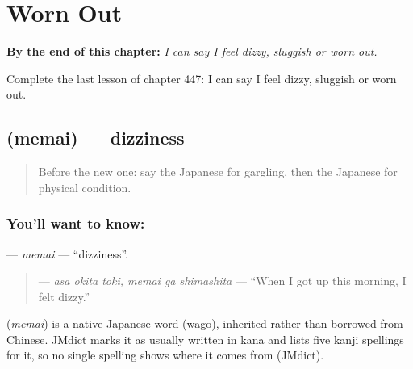 
\chapter{Worn Out}
\label{ch:ja-worn-out}

\begin{chapteropening}
\textbf{By the end of this chapter:} \emph{I can say I feel dizzy, sluggish or worn out.}

Complete the last lesson of chapter 447: I can say I feel dizzy, sluggish or worn out.
\end{chapteropening}

\section[\texorpdfstring{\ja{めまい} (memai)}{めまい (memai)}]{ (memai) — dizziness}

\label{lesson:JA-C447-memai}



\begin{quote}
Before the new one: say the Japanese for gargling, then the Japanese for physical condition.
\end{quote}

\subsection*{You'll want to know: }
\textbf{} — \emph{memai} — \textquotedblleft{}dizziness\textquotedblright{}.

\begin{quote}
\textbf{   } — \emph{asa okita toki, memai ga shimashita} — \textquotedblleft{}When I got up this morning, I felt dizzy.\textquotedblright{}
\end{quote}

\begin{cousinweb}
\textbf{} (\emph{memai}) is a native Japanese word (wago), inherited rather than borrowed from Chinese. JMdict marks it as usually written in kana and lists five kanji spellings for it, so no single spelling shows where it comes from (JMdict).
\end{cousinweb}

